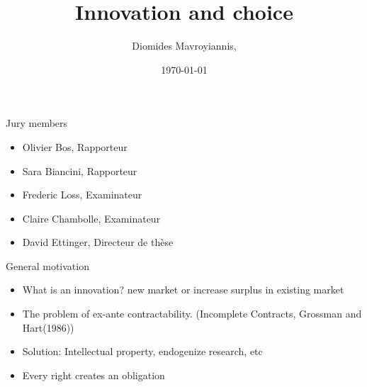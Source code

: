 \documentclass{beamer}
\title[Innovation and choice]{Innovation and choice} %
\author{ Diomides Mavroyiannis, } %
\institute[Dauphine] %
{
PSL/Paris Dauphine \\ %
\medskip%
}
\date{\today} %
\numberwithin{equation}{section}
\begin{document}
\begin{frame}
\titlepage %
\end{frame}


\begin{frame}{Jury members}
\begin{itemize}
    \item Olivier Bos, Rapporteur
    \item Sara Biancini, Rapporteur
    \item Frederic Loss, Examinateur
    \item Claire Chambolle, Examinateur
    \item David Ettinger, Directeur de thèse 
\end{itemize}
\end{frame}

\begin{frame}{General motivation}
\begin{itemize}
    \item What is an innovation? new market or increase surplus in existing market
    \item The problem of ex-ante contractability. (Incomplete Contracts, Grossman and Hart(1986))
    \item Solution: Intellectual property, endogenize research, etc
    \item Every right creates an obligation
\end{itemize}
\end{frame}
\end{document}
